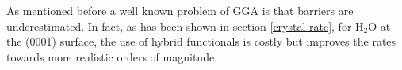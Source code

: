 \documentclass[11pt,DIV=13,BCOR=5mm,a4paper,headinclude]{scrbook}
\begin{document}

As mentioned before a well known problem of GGA is that barriers are underestimated\cite{Zhao05}.
In fact, as has been shown in section \ref{crystal-rate}, for H$_2$O at the (0001) surface, the use of hybrid functionals is costly but improves the rates towards more realistic orders of magnitude.
\end{document}
